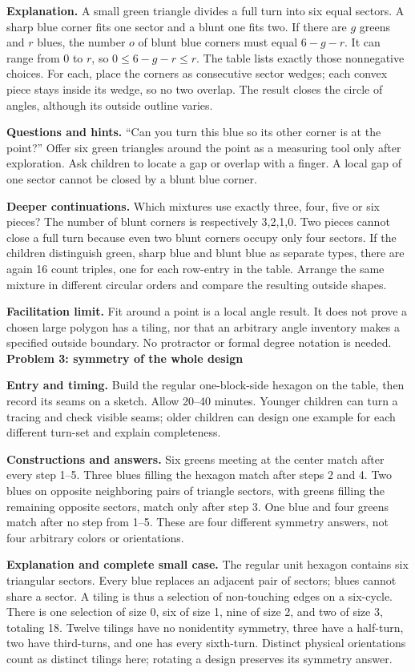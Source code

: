 \documentclass[11pt]{article}
\newcommand\lead[1]{\textbf{#1}\par}
\begin{document}
\textbf{Explanation.} A small green triangle divides a full turn into six equal sectors. A sharp blue corner fits one sector and a blunt one fits two. If there are $g$ greens and $r$ blues, the number $o$ of blunt blue corners must equal $6-g-r$. It can range from 0 to $r$, so $0\le6-g-r\le r$. The table lists exactly those nonnegative choices. For each, place the corners as consecutive sector wedges; each convex piece stays inside its wedge, so no two overlap. The result closes the circle of angles, although its outside outline varies.

\textbf{Questions and hints.} ``Can you turn this blue so its other corner is at the point?'' Offer six green triangles around the point as a measuring tool only after exploration. Ask children to locate a gap or overlap with a finger. A local gap of one sector cannot be closed by a blunt blue corner.

\textbf{Deeper continuations.} Which mixtures use exactly three, four, five or six pieces? The number of blunt corners is respectively 3,2,1,0. Two pieces cannot close a full turn because even two blunt corners occupy only four sectors. If the children distinguish green, sharp blue and blunt blue as separate types, there are again 16 count triples, one for each row-entry in the table. Arrange the same mixture in different circular orders and compare the resulting outside shapes.

\textbf{Facilitation limit.} Fit around a point is a local angle result. It does not prove a chosen large polygon has a tiling, nor that an arbitrary angle inventory makes a specified outside boundary. No protractor or formal degree notation is needed.
\newpage
\lead{Problem 3: symmetry of the whole design}
\textbf{Entry and timing.} Build the regular one-block-side hexagon on the table, then record its seams on a sketch. Allow 20--40 minutes. Younger children can turn a tracing and check visible seams; older children can design one example for each different turn-set and explain completeness.

\textbf{Constructions and answers.} Six greens meeting at the center match after every step 1--5. Three blues filling the hexagon match after steps 2 and 4. Two blues on opposite neighboring pairs of triangle sectors, with greens filling the remaining opposite sectors, match only after step 3. One blue and four greens match after no step from 1--5. These are four different symmetry answers, not four arbitrary colors or orientations.

\textbf{Explanation and complete small case.} The regular unit hexagon contains six triangular sectors. Every blue replaces an adjacent pair of sectors; blues cannot share a sector. A tiling is thus a selection of non-touching edges on a six-cycle. There is one selection of size 0, six of size 1, nine of size 2, and two of size 3, totaling 18. Twelve tilings have no nonidentity symmetry, three have a half-turn, two have third-turns, and one has every sixth-turn. Distinct physical orientations count as distinct tilings here; rotating a design preserves its symmetry answer.
\end{document}
